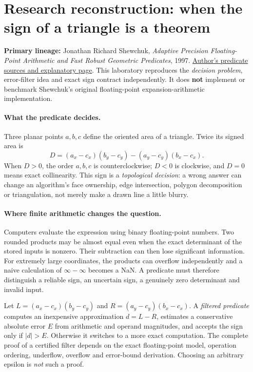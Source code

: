 \clearpage
\section*{Research reconstruction: when the sign of a triangle is a theorem}
\noindent\textbf{Primary lineage:} Jonathan Richard Shewchuk,
\emph{Adaptive Precision Floating-Point Arithmetic and Fast Robust
Geometric Predicates}, 1997.
\href{https://www.cs.cmu.edu/~quake/robust.html}{Author's predicate sources
and explanatory page}. This laboratory reproduces the \emph{decision
problem}, error-filter idea and exact sign contract independently.
It does \textbf{not} implement or benchmark Shewchuk's original
floating-point expansion-arithmetic implementation.

\paragraph{What the predicate decides.}
Three planar points \(a,b,c\) define the oriented area of a triangle.
Twice its signed area is
\[
D=(a_x-c_x)(b_y-c_y)-(a_y-c_y)(b_x-c_x).
\]
When \(D>0\), the order \(a,b,c\) is counterclockwise; \(D<0\)
is clockwise, and \(D=0\) means exact collinearity. This sign is a
\emph{topological decision}: a wrong answer can change an algorithm's
face ownership, edge intersection, polygon decomposition or
triangulation, not merely make a drawn line a little blurry.

\paragraph{Where finite arithmetic changes the question.}
Computers evaluate the expression using binary floating-point numbers.
Two rounded products may be almost equal even when the exact determinant
of the stored inputs is nonzero. Their subtraction can then lose
significant information. For extremely large coordinates, the
products can overflow independently and a naive calculation of
\(\infty-\infty\) becomes a NaN. A predicate must therefore distinguish
a reliable sign, an uncertain sign, a genuinely zero determinant and
invalid input.

Let \(L=(a_x-c_x)(b_y-c_y)\) and
\(R=(a_y-c_y)(b_x-c_x)\). A \emph{filtered predicate} computes
an inexpensive approximation \(d=L-R\), estimates a conservative
absolute error \(E\) from arithmetic and operand magnitudes,
and accepts the sign only if \(|d|>E\). Otherwise it switches
to a more exact computation. The complete proof of a certified
filter depends on the exact floating-point model, operation ordering,
underflow, overflow and error-bound derivation. Choosing an arbitrary
epsilon is \emph{not} such a proof.

